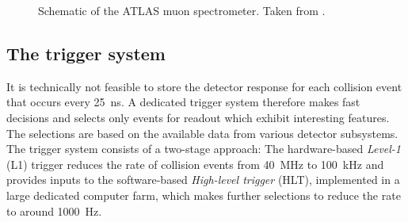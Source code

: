 
\FloatBarrier
\begin{figure}[t]
    \caption{Schematic of the ATLAS muon spectrometer. Taken from .}
    \label{fig:ATLASmuonspectrometer}
\end{figure}



\subsection{The trigger system}
\label{sec:trigger-system}
It is technically not feasible to store the detector response for each collision event that occurs every \SI{25}{\nano\second}.
A dedicated trigger system therefore makes fast decisions and selects only events for readout which exhibit interesting features.
The selections are based on the available data from various detector subsystems.
The \RunTwo trigger system consists of a two-stage approach:
The hardware-based \emph{Level-1} (L1) trigger reduces the rate of collision events from \SI{40}{\mega\hertz} to \SI{100}{\kilo\hertz} and provides inputs to the software-based \emph{High-level trigger} (HLT), implemented in a large dedicated computer farm, which makes further selections to reduce the rate to around \SI{1000}{\hertz}.

